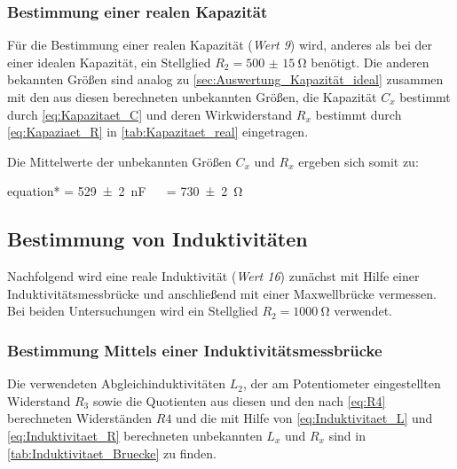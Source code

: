 	\subsubsection{Bestimmung einer realen Kapazität}
	\label{sec:Auswertung_Kapazität_real}
		
		Für die Bestimmung einer realen Kapazität (\emph{Wert 9}) wird, anderes als bei der einer idealen Kapazität, ein
		Stellglied $R_{2} = \SI{500(15)}{\ohm}$ benötigt. Die anderen bekannten Größen sind analog zu
		 \cref{sec:Auswertung_Kapazität_ideal} zusammen mit den aus diesen 
		berechneten unbekannten Größen, die Kapazität $C_{x}$ bestimmt durch \cref{eq:Kapazitaet_C} und deren
		 Wirkwiderstand $R_{x}$ bestimmt durch \cref{eq:Kapaziaet_R} in 
		\cref{tab:Kapazitaet_real} eingetragen. 
	
		
		
		Die Mittelwerte der unbekannten Größen $C_{x}$ und $R_{x}$ ergeben sich somit zu:
		\begin{empheq}{equation*}
				 = \SI{529(2)}{\nano\farad} \quad\ \ \quad {} = \SI{730(2)}{\ohm}
		\end{empheq}  
	
\subsection{Bestimmung von Induktivitäten}
\label{sec:Auswertung_Induktivität}

	Nachfolgend wird eine reale Induktivität (\emph{Wert 16}) zunächst mit Hilfe einer Induktivitätsmessbrücke
	und anschließend mit einer Maxwellbrücke vermessen. Bei beiden Untersuchungen wird 
	ein Stellglied $R_{2} = \SI{1000}{\ohm}$ verwendet.
	
	\subsubsection{Bestimmung Mittels einer Induktivitätsmessbrücke}
	\label{sec:Auswertung_Induktivität_Messbrücke}
	
		Die verwendeten Abgleichinduktivitäten $L_{2}$, der am Potentiometer eingestellten Widerstand
		$R_{3}$ sowie die Quotienten aus diesen und den nach \cref{eq:R4} berechneten Widerständen $R4$
		und die mit Hilfe von \cref{eq:Induktivitaet_L} und \cref{eq:Induktivitaet_R} berechneten unbekannten $L_{x}$
		 und $R_{x}$ sind in \cref{tab:Induktivitaet_Bruecke} zu finden.    
		
		
		

